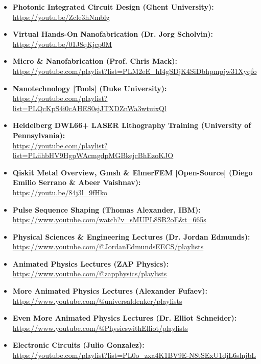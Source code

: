 \begin{itemize}
  \item\textbf{Photonic Integrated Circuit Design (Ghent University):}\\
\url{https://youtu.be/Zcle3hNmblg}

  \item\textbf{Virtual Hands-On Nanofabrication (Dr. Jorg Scholvin):}\\
\url{https://youtu.be/01J8qKjcp0M}

  \item\textbf{Micro \& Nanofabrication (Prof. Chris Mack):}\\
\url{https://youtube.com/playlist?list=PLM2eE_hI4gSDjK4SiDbhpmpjw31Xyqfo}

  \item\textbf{Nanotechnology [Tools] (Duke University):}\\
\url{https://youtube.com/playlist?list=PLQcKpS4i0cAHES0sjJTXDZnWa3wtuixQl}

  \item\textbf{Heidelberg DWL66+ LASER Lithography Training (University of Pennsylvania):}\\
\url{https://youtube.com/playlist?list=PLiihbHV9HgpWAcmgdpMGBkejcBhEzoKJO}

  \item\textbf{Qiskit Metal Overview, Gmsh \& ElmerFEM [Open-Source] (Diego Emilio Serrano \& Abeer Vaishnav):}\\
\url{https://youtu.be/84j3l_9fHko}

  \item\textbf{Pulse Sequence Shaping (Thomas Alexander, IBM):}\\
\url{https://www.youtube.com/watch?v=sMUPL8SR2oE&t=665s}

  \item\textbf{Physical Sciences \& Engineering Lectures (Dr. Jordan Edmunds):}\\
\url{https://www.youtube.com/@JordanEdmundsEECS/playlists}

  \item\textbf{Animated Physics Lectures (ZAP Physics):}\\
\url{https://www.youtube.com/@zapphysics/playlists}

  \item\textbf{More Animated Physics Lectures (Alexander Fufaev):}\\
\url{https://www.youtube.com/@universaldenker/playlists}

  \item\textbf{Even More Animated Physics Lectures (Dr. Elliot Schneider):}\\
\url{https://www.youtube.com/@PhysicswithElliot/playlists}

  \item\textbf{Electronic Circuits (Julio Gonzalez):}\\
\url{https://youtube.com/playlist?list=PL0o_zxa4K1BV9E-N8tSExU1djL6slnjbL}

\end{itemize}

